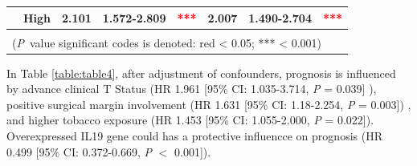 \documentclass[12pt, a4paper]{article}
\begin{document}
\begin{table}[hp]
{\begin{tabular}{|l|l|l|l|l|l|l|l|}
\cline{2-8}
                                        & High                                                                                & 2.101                                                                          & 1.572-2.809                                                                   & \multicolumn{1}{c|}{\textcolor{red}{***}}                                     & 2.007                                                                          & 1.490-2.704                                                                   & \multicolumn{1}{c|}{\textcolor{red}{***}}                                      \\ 
\hline
\multicolumn{8}{|l|}{}                                                                                                                                                                                                                                                                                                                                                                                                                                                                                                                                                                                                           \\ 
\hline
\multicolumn{8}{|l|}{(\textit{P}~value significant codes is denoted: red \textless{} 0.05; *** \textless{} 0.001)}                                                                                                                                                                                                                                                                                                                                                                                                                                                                                                               \\
\hline
\end{tabular}
} %
{}
\label{table:table2}
\end{table}




In Table \ref{table:table4},
after adjustment of confounders, prognosis is influenced by advance clinical T Status (HR 1.961 [95\% CI: 1.035-3.714, \textit{P} = 0.039] ), positive surgical margin involvement (HR 1.631 [95\% CI: 1.18-2.254, \textit{P} = 0.003]) , and higher tobacco exposure (HR 1.453 [95\% CI: 1.055-2.000, \textit{P} = 0.022]).
Overexpressed \acrshort{IL19} gene could has a protective influencce on prognosis (HR 0.499 [95\% CI: 0.372-0.669, \textit{P} $<$ 0.001]).
\end{document}
